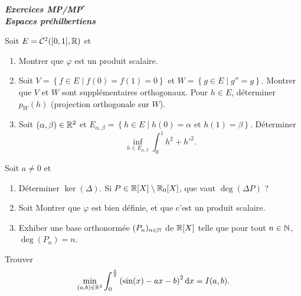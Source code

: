 \documentclass[12pt]{article}
\begin{document}
\begin{titlepage}
	\centering
	\vspace*{\fill}
	\Huge \textit{\textbf{Exercices MP/MP$^*$\\ Espaces préhilbertiens}}
	\vspace*{\fill}
\end{titlepage}

\begin{exercise}
	Soit $E=\mathcal{C}^{2}([0,1],\mathbb{R})$ et 
	\begin{enumerate}
		\item Montrer que $\varphi$ est un produit scalaire.
		\item Soit $V=\left\lbrace f\in E\middle| f(0)=f(1)=0\right\rbrace$ et $W=\left\lbrace g\in E\middle| g''=g\right\rbrace$. Montrer que $V$ et $W$ sont supplémentaires orthogonaux. Pour $h\in E$, déterminer $p_{W}(h)$ (projection orthogonale sur $W$).
		\item Soit $(\alpha,\beta)\in\mathbb{R}^{2}$ et $E_{\alpha,\beta}=\left\lbrace h\in E\middle| h(0)=\alpha\text{ et }h(1)=\beta\right\rbrace$. Déterminer 
		\begin{equation}
			\inf\limits_{h\in E_{\alpha,\beta}}\int_{0}^{1}h^{2}+h'^{2}.
		\end{equation}
	\end{enumerate}
\end{exercise}
    
\begin{exercise}
	Soit $a\neq0$ et 
	\begin{enumerate}
		\item Déterminer $\ker(\Delta)$. Si $P\in\mathbb{R}[X]\setminus\mathbb{R}_{0}[X]$, que vaut $\deg(\Delta P)$ ?
		\item Soit 
		Montrer que $\varphi$ est bien définie, et que c'est un produit scalaire.

		\item Exhiber une base orthonormée $(P_n)_{n\in\mathbb{N}}$ de $\mathbb{R}[X]$ telle que pour tout $n\in\mathbb{N}$, $\deg(P_n)=n$.
	\end{enumerate}
\end{exercise}

\begin{exercise}
	Trouver 
	\begin{equation}
		\min\limits_{(a,b)\in\mathbb{R}^{2}}\int_{0}^{\frac{\pi}{2}}\left(\sin(x)-ax-b\right)^{2}\mathrm{d} x=I(a,b).
	\end{equation}
\end{exercise}
\end{document}
